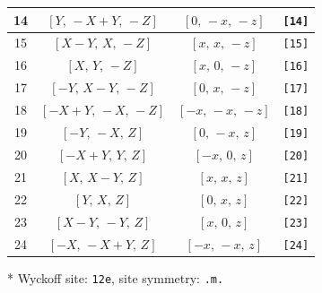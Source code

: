 \documentclass[fleqn,8pt]{jsarticle}
\begin{document}
\begin{longtable}{cccc}
14 & $\left[ Y,\, - X + Y,\, - Z \right]$ & $\left[ 0,\, - x,\, - z \right]$ & {\tt [14]} \\ \hline
15 & $\left[ X - Y,\, X,\, - Z \right]$ & $\left[ x,\, x,\, - z \right]$ & {\tt [15]} \\ \hline
16 & $\left[ X,\, Y,\, - Z \right]$ & $\left[ x,\, 0,\, - z \right]$ & {\tt [16]} \\ \hline
17 & $\left[ - Y,\, X - Y,\, - Z \right]$ & $\left[ 0,\, x,\, - z \right]$ & {\tt [17]} \\ \hline
18 & $\left[ - X + Y,\, - X,\, - Z \right]$ & $\left[ - x,\, - x,\, - z \right]$ & {\tt [18]} \\ \hline
19 & $\left[ - Y,\, - X,\, Z \right]$ & $\left[ 0,\, - x,\, z \right]$ & {\tt [19]} \\ \hline
20 & $\left[ - X + Y,\, Y,\, Z \right]$ & $\left[ - x,\, 0,\, z \right]$ & {\tt [20]} \\ \hline
21 & $\left[ X,\, X - Y,\, Z \right]$ & $\left[ x,\, x,\, z \right]$ & {\tt [21]} \\ \hline
22 & $\left[ Y,\, X,\, Z \right]$ & $\left[ 0,\, x,\, z \right]$ & {\tt [22]} \\ \hline
23 & $\left[ X - Y,\, - Y,\, Z \right]$ & $\left[ x,\, 0,\, z \right]$ & {\tt [23]} \\ \hline
24 & $\left[ - X,\, - X + Y,\, Z \right]$ & $\left[ - x,\, - x,\, z \right]$ & {\tt [24]} \\
\end{longtable}
* Wyckoff site: {\tt 12e}, site symmetry: {\tt .m.}
\renewcommand{\arraystretch}{1.2}
\end{document}

